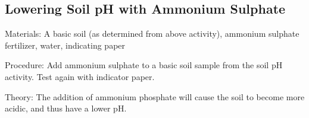 \begin{multicols}{2}
\subsection{Lowering Soil pH with Ammonium Sulphate}


\begin{description*}
\item[Materials:]{A basic soil (as determined from above activity), ammonium sulphate fertilizer, water,  indicating paper}
\item[Procedure:]{Add ammonium sulphate to a basic soil sample from the soil pH activity. Test again with indicator paper.}
\item[Theory:]{The addition of ammonium phosphate will cause the soil to become more acidic, and thus have a lower pH.}
\end{description*}


\end{multicols}

\pagebreak